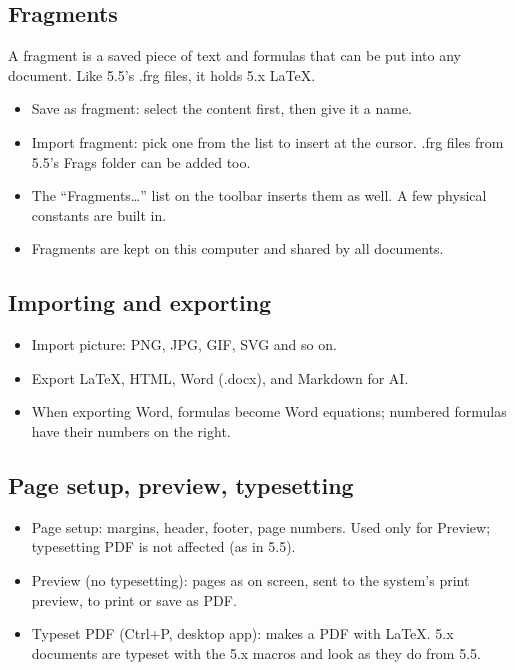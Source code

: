 \subsection{Fragments}

A fragment is a saved piece of text and formulas that can be put into any document. Like 5.5's .frg files, it holds 5.x LaTeX.

\begin{itemize}
\item Save as fragment: select the content first, then give it a name.
\item Import fragment: pick one from the list to insert at the cursor. .frg files from 5.5's Frags folder can be added too.
\item The ``Fragments…'' list on the toolbar inserts them as well. A few physical constants are built in.
\item Fragments are kept on this computer and shared by all documents.
\end{itemize}

\subsection{Importing and exporting}

\begin{itemize}
\item Import picture: PNG, JPG, GIF, SVG and so on.
\item Export LaTeX, HTML, Word (.docx), and Markdown for AI.
\item When exporting Word, formulas become Word equations; numbered formulas have their numbers on the right.
\end{itemize}

\subsection{Page setup, preview, typesetting}

\begin{itemize}
\item Page setup: margins, header, footer, page numbers. Used only for Preview; typesetting PDF is not affected (as in 5.5).
\item Preview (no typesetting): pages as on screen, sent to the system's print preview, to print or save as PDF.
\item Typeset PDF (Ctrl+P, desktop app): makes a PDF with LaTeX. 5.x documents are typeset with the 5.x macros and look as they do from 5.5.
\end{itemize}

